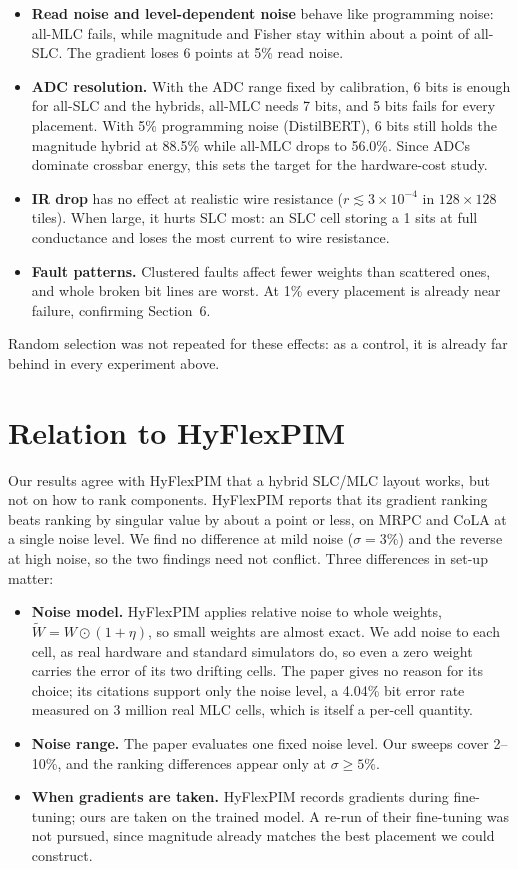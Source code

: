 \documentclass[10pt,a4paper]{article}
\begin{document}
\begin{itemize}
\item \textbf{Read noise and level-dependent noise} behave like programming noise: all-MLC fails, while
magnitude and Fisher stay within about a point of all-SLC. The gradient loses 6 points at 5\% read noise.
\item \textbf{ADC resolution.} With the ADC range fixed by calibration, 6 bits is enough for all-SLC and the
hybrids, all-MLC needs 7 bits, and 5 bits fails for every placement. With 5\% programming noise
(DistilBERT), 6 bits still holds the magnitude hybrid at 88.5\% while all-MLC drops to 56.0\%. Since ADCs
dominate crossbar energy, this sets the target for the hardware-cost study.
\item \textbf{IR drop} has no effect at realistic wire resistance ($r\lesssim3\times10^{-4}$ in
$128\times128$ tiles). When large, it hurts SLC most: an SLC cell storing a 1 sits at full conductance and
loses the most current to wire resistance.
\item \textbf{Fault patterns.} Clustered faults affect fewer weights than scattered ones, and whole broken
bit lines are worst. At 1\% every placement is already near failure, confirming Section~6.
\end{itemize}
Random selection was not repeated for these effects: as a control, it is already far behind in every
experiment above.

\section{Relation to HyFlexPIM}
Our results agree with HyFlexPIM that a hybrid SLC/MLC layout works, but not on how to rank components.
HyFlexPIM reports that its gradient ranking beats ranking by singular value by about a point or less, on
MRPC and CoLA at a single noise level. We find no difference at mild noise ($\sigma=3\%$) and the reverse
at high noise, so the two findings need not conflict. Three differences in set-up matter:
\begin{itemize}
\item \textbf{Noise model.} HyFlexPIM applies relative noise to whole weights, $\tilde W=W\odot(1+\eta)$, so
small weights are almost exact. We add noise to each cell, as real hardware and standard simulators do,
so even a zero weight carries the error of its two drifting cells. The paper gives no reason for its choice;
its citations support only the noise level, a 4.04\% bit error rate measured on 3 million real MLC cells,
which is itself a per-cell quantity.
\item \textbf{Noise range.} The paper evaluates one fixed noise level. Our sweeps cover 2--10\%, and the
ranking differences appear only at $\sigma\geq5\%$.
\item \textbf{When gradients are taken.} HyFlexPIM records gradients during fine-tuning; ours are taken on
the trained model. A re-run of their fine-tuning was not pursued, since magnitude already matches the
best placement we could construct.
\end{itemize}
\end{document}
